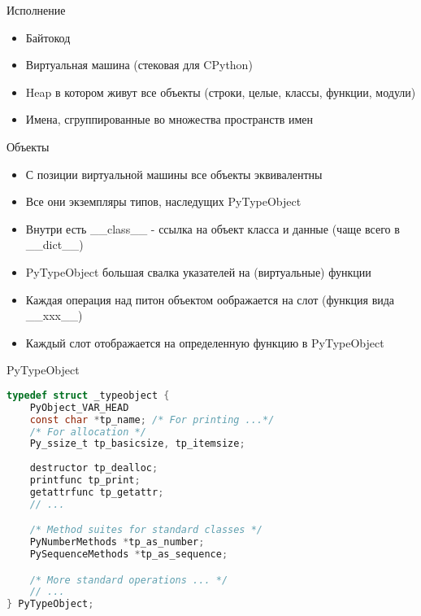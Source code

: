\documentclass{article}
\begin{document}
\begin{center} Исполнение \end{center}
\begin{itemize}
	\item Байтокод
	\item Виртуальная машина (стековая для CPython)
	\item Heap в котором живут все объекты (строки, целые, классы, функции, модули)
	\item Имена, сгруппированные во множества пространств имен
\end{itemize}
\newpage

\begin{center} Объекты \end{center}
\begin{itemize}
	\item С позиции виртуальной машины все объекты эквивалентны
	\item Все они экземпляры типов, наследущих PyTypeObject
	\item Внутри есть \_\_class\_\_ - ссылка на объект класса и данные (чаще всего в \_\_dict\_\_)
	\item PyTypeObject большая свалка указателей на (виртуальные) функции
	\item Каждая операция над питон объектом оображается на слот (функция вида \_\_xxx\_\_)
	\item Каждый слот отображается на определенную функцию в PyTypeObject
\end{itemize}
\newpage

\begin{center} PyTypeObject \end{center}
\begin{lstlisting}[language=C]
typedef struct _typeobject {
    PyObject_VAR_HEAD
    const char *tp_name; /* For printing ...*/
    /* For allocation */
    Py_ssize_t tp_basicsize, tp_itemsize; 
    
    destructor tp_dealloc;
    printfunc tp_print;
    getattrfunc tp_getattr;
    // ...

    /* Method suites for standard classes */
    PyNumberMethods *tp_as_number;
    PySequenceMethods *tp_as_sequence;

    /* More standard operations ... */
    // ...
} PyTypeObject;
\end{lstlisting}
\newpage
\end{document}
